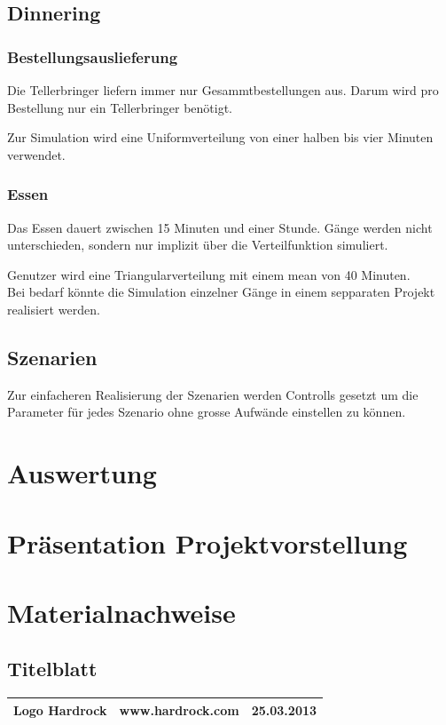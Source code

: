 \documentclass[ngerman,a4paper,12pt]{scrreprt}
\begin{document}
			
	\section{Dinnering}
		\subsection{Bestellungsauslieferung}					
			Die Tellerbringer liefern immer nur Gesammtbestellungen aus. Darum wird pro Bestellung nur ein Tellerbringer benötigt.
			
			Zur Simulation wird eine Uniformverteilung von einer halben bis vier Minuten verwendet.


		\subsection{Essen}
			Das Essen dauert zwischen 15 Minuten und einer Stunde. Gänge werden nicht unterschieden, sondern nur implizit über die Verteilfunktion simuliert.
			
			Genutzer wird eine Triangularverteilung mit einem mean von 40 Minuten.\\
			
			
			Bei bedarf könnte die Simulation einzelner Gänge in einem sepparaten Projekt realisiert werden.
			
			
			
	\section{Szenarien}
		Zur einfacheren Realisierung der Szenarien werden Controlls gesetzt um die Parameter für jedes Szenario ohne grosse Aufwände einstellen zu können.		
			
			
			
			
			
			

\chapter{Auswertung}



\appendix
\chapter{Präsentation Projektvorstellung}


\listoffigures

\chapter{Materialnachweise}
\section{Titelblatt}
\begin{tabularx}{\textwidth}{|Xlr|}
		\hline
		Logo Hardrock & www.hardrock.com & 25.03.2013 \\
		\hline
\end{tabularx}
\end{document}
